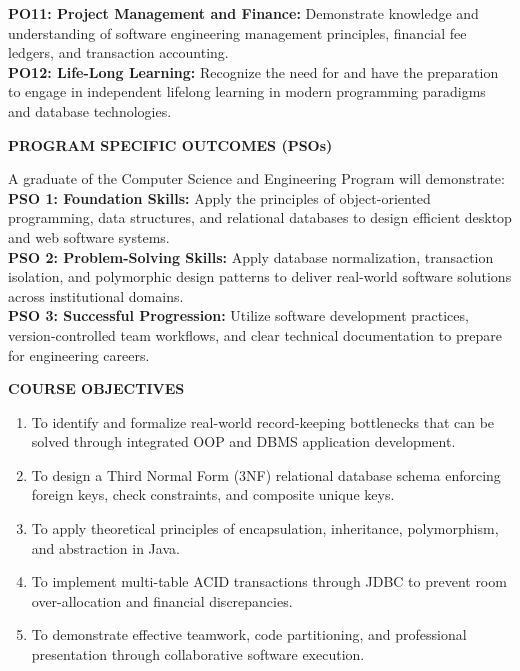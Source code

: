 \documentclass[12pt,a4paper]{report}
\begin{document}
\newpage

\noindent \textbf{PO11: Project Management and Finance:} Demonstrate knowledge and understanding of software engineering management principles, financial fee ledgers, and transaction accounting.\\[0.2cm]
\noindent \textbf{PO12: Life-Long Learning:} Recognize the need for and have the preparation to engage in independent lifelong learning in modern programming paradigms and database technologies.

\vspace{0.5cm}
\begin{center}
{\Large \textbf{PROGRAM SPECIFIC OUTCOMES (PSOs)}\par}
\end{center}
\vspace{0.2cm}

\noindent A graduate of the Computer Science and Engineering Program will demonstrate:\\[0.2cm]
\noindent \textbf{PSO 1: Foundation Skills:} Apply the principles of object-oriented programming, data structures, and relational databases to design efficient desktop and web software systems.\\[0.2cm]
\noindent \textbf{PSO 2: Problem-Solving Skills:} Apply database normalization, transaction isolation, and polymorphic design patterns to deliver real-world software solutions across institutional domains.\\[0.2cm]
\noindent \textbf{PSO 3: Successful Progression:} Utilize software development practices, version-controlled team workflows, and clear technical documentation to prepare for engineering careers.

\vspace{0.5cm}
\begin{center}
{\Large \textbf{COURSE OBJECTIVES}\par}
\end{center}
\vspace{0.2cm}

\begin{enumerate}
\item To identify and formalize real-world record-keeping bottlenecks that can be solved through integrated OOP and DBMS application development.
\item To design a Third Normal Form (3NF) relational database schema enforcing foreign keys, check constraints, and composite unique keys.
\item To apply theoretical principles of encapsulation, inheritance, polymorphism, and abstraction in Java.
\item To implement multi-table ACID transactions through JDBC to prevent room over-allocation and financial discrepancies.
\item To demonstrate effective teamwork, code partitioning, and professional presentation through collaborative software execution.
\end{enumerate}
\end{document}
